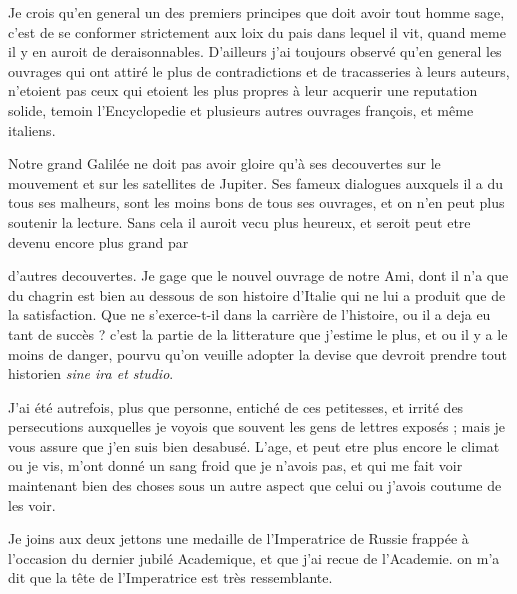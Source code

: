 \documentclass[11pt,a4paper]{article}
\begin{document}

Je crois qu'en general un des premiers principes que doit avoir tout homme
sage, c'est de se conformer strictement aux loix du pais dans lequel il vit,
quand meme il y en auroit de deraisonnables. D'ailleurs j'ai toujours observé
qu'en general les ouvrages qui ont attiré le plus de contradictions et de
tracasseries à leurs auteurs, n'etoient pas ceux qui etoient les plus propres
à leur acquerir une reputation solide, temoin l'Encyclopedie et plusieurs
autres ouvrages françois, et même italiens.

Notre grand Galilée \struck{\ill{}} ne doit pas avoir gloire qu'à ses
decouvertes sur le mouvement et sur les satellites de Jupiter. Ses fameux
dialogues auxquels il a du tous ses malheurs, sont les moins bons de tous ses
ouvrages, et on n'en peut plus soutenir la lecture. Sans cela il auroit vecu
plus heureux, et seroit peut etre devenu encore plus grand par


d'autres decouvertes. Je gage que le nouvel ouvrage de notre Ami, dont il n'a
que du chagrin est bien au dessous de son histoire d'Italie qui
\struck{\ill{}} ne lui a produit que de la satisfaction. Que ne s'exerce-t-il
dans la carrière de l'histoire, ou il a deja eu tant de succès ? c'est la
partie de la litterature que j'estime le plus, et ou il y a le moins de
danger, pourvu qu'on veuille adopter la devise que devroit prendre tout
historien \emph{sine ira et studio}.

J'ai été autrefois, plus que personne, entiché de ces petitesses, et irrité
des persecutions \struck{\ill{}} auxquelles je voyois que souvent les gens de
lettres exposés ; mais je vous assure que j'en suis bien desabusé. L'age, et
peut etre plus encore le climat ou je vis, m'ont donné un sang froid que je
n'avois pas, et qui me fait voir maintenant bien des choses sous un autre
aspect que celui ou j'avois coutume de les voir.

Je joins aux deux jettons une medaille de l'Imperatrice de Russie frappée à
l'occasion du dernier jubilé Academique, et que j'ai recue de l'Academie. on
m'a dit que la tête de l'Imperatrice est très ressemblante.
\end{document}

